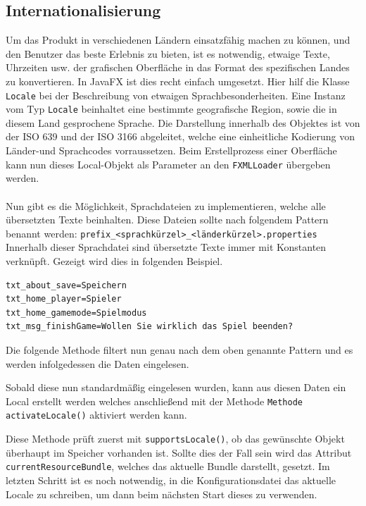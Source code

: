 \subsection{Internationalisierung}\label{sssec:internationalization}
Um das Produkt in verschiedenen Ländern einsatzfähig machen zu können, und den Benutzer das beste Erlebnis zu bieten, ist es notwendig, etwaige Texte, Uhrzeiten usw. der grafischen Oberfläche in das Format des spezifischen Landes zu konvertieren.
In JavaFX ist dies recht einfach umgesetzt.
Hier hilf die Klasse \lstinline[style=java]{Locale} bei der Beschreibung von etwaigen Sprachbesonderheiten.
Eine Instanz vom Typ \lstinline[style=java]{Locale} beinhaltet eine bestimmte geografische Region, sowie die in diesem Land gesprochene Sprache.
Die Darstellung innerhalb des Objektes ist von der ISO 639 und der ISO 3166 abgeleitet, welche eine einheitliche Kodierung von Länder-und Sprachcodes vorraussetzen.
Beim Erstellprozess einer Oberfläche kann nun dieses Local-Objekt als Parameter an den \lstinline[style=java]{FXMLLoader} übergeben werden.\\\\
Nun gibt es die Möglichkeit, Sprachdateien zu implementieren, welche alle übersetzten Texte beinhalten.
Diese Dateien sollte nach folgendem Pattern benannt werden: \lstinline[style=java]{prefix_<sprachkürzel>_<länderkürzel>.properties}\\
Innerhalb dieser Sprachdatei sind übersetzte Texte immer mit Konstanten verknüpft.
Gezeigt wird dies in folgenden Beispiel.
\begin{lstlisting}[style=java,caption=Beispielbundle,label=resource]
txt_about_save=Speichern
txt_home_player=Spieler
txt_home_gamemode=Spielmodus
txt_msg_finishGame=Wollen Sie wirklich das Spiel beenden?
\end{lstlisting}
Die folgende Methode filtert nun genau nach dem oben genannte Pattern und es werden infolgedessen die Daten eingelesen.

Sobald diese nun standardmäßig eingelesen wurden, kann aus diesen Daten ein Local erstellt werden welches anschließend mit der Methode \lstinline[style=java]{Methode activateLocale()} aktiviert werden kann.

Diese Methode prüft zuerst mit \lstinline[style=java]{supportsLocale()}, ob das gewünschte Objekt überhaupt im Speicher vorhanden ist.
Sollte dies der Fall sein wird das Attribut \lstinline[style=java]{currentResourceBundle}, welches das aktuelle Bundle darstellt, gesetzt.
Im letzten Schritt ist es noch notwendig, in die Konfigurationsdatei das aktuelle Locale zu schreiben, um dann beim nächsten Start dieses zu verwenden.
\newpage
